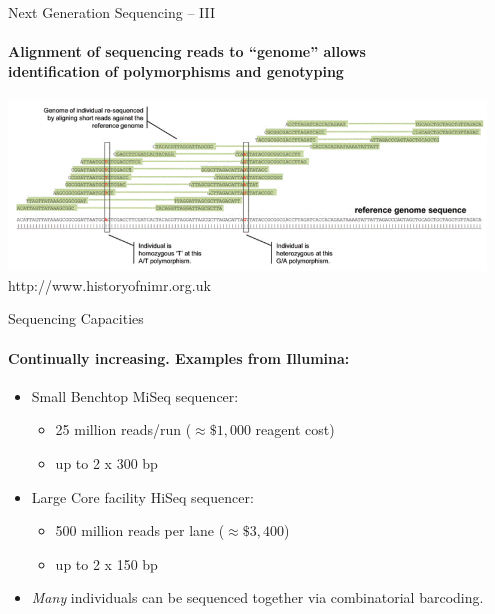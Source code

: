 \documentclass[letter,graphicx]{beamer}
\begin{document}
\begin{frame}{Next Generation Sequencing -- III}
\framesubtitle{Alignment of sequencing reads to ``genome'' allows \\
identification of polymorphisms and genotyping}
{\centering
\includegraphics[width=0.95\textwidth]{mhap_figs/alignment.png}
}\\
{\tiny http://www.historyofnimr.org.uk}
\end{frame}






\begin{frame}{Sequencing Capacities}
\framesubtitle{Continually increasing.  Examples from Illumina:}
\begin{itemize}
\item Small Benchtop MiSeq sequencer:
\begin{itemize}
\item 25 million reads/run ($\approx \$1,000$ reagent cost)
\item up to 2 x 300 bp
\end{itemize}

\item Large Core facility HiSeq sequencer:
\begin{itemize}
\item 500 million reads per lane ($\approx \$3,400$)
\item up to 2 x 150 bp
\end{itemize}
\end{itemize}


\begin{itemize}
\item {\em Many} individuals can be sequenced together via combinatorial barcoding.
\end{itemize}
\end{frame}
\end{document}
